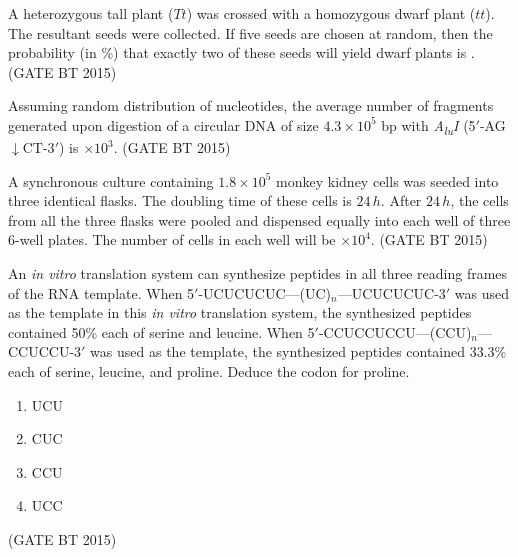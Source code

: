 \item A heterozygous tall plant ($Tt$) was crossed with a homozygous dwarf plant ($tt$). The resultant seeds were collected. If five seeds are chosen at random, then the probability (in \%) that exactly two of these seeds will yield dwarf plants is \underline{\hspace{2cm}}.
\hfill (GATE BT 2015)


 

\item Assuming random distribution of nucleotides, the average number of fragments generated upon digestion of a circular DNA of size $4.3 \times 10^{5}$ bp with \textit{A\textsubscript{lu}I} (5$'$-AG$\downarrow$CT-3$'$) is \underline{\hspace{2cm}} $\times 10^{3}$.
\hfill (GATE BT 2015)


\item A synchronous culture containing $1.8 \times 10^{5}$ monkey kidney cells was seeded into three identical flasks. The doubling time of these cells is $24 \, h$. After $24 \, h$, the cells from all the three flasks were pooled and dispensed equally into each well of three $6$-well plates. The number of cells in each well will be \underline{\hspace{2cm}} $\times 10^{4}$. 
\hfill (GATE BT 2015)




\item An \textit{in vitro} translation system can synthesize peptides in all three reading frames of the RNA template. 
When 5$'$-UCUCUCUC---(UC)$_n$---UCUCUCUC-3$'$ was used as the template in this \textit{in vitro} translation system, the synthesized peptides contained 50\% each of serine and leucine. 
When 5$'$-CCUCCUCCU---(CCU)$_n$---CCUCCU-3$'$ was used as the template, the synthesized peptides contained 33.3\% each of serine, leucine, and proline. 
Deduce the codon for proline.  

\begin{multicols}{4}
\begin{enumerate}
\item UCU  
\item CUC  
\item CCU  
\item UCC  
\end{enumerate}
\end{multicols}\hfill (GATE BT 2015)



